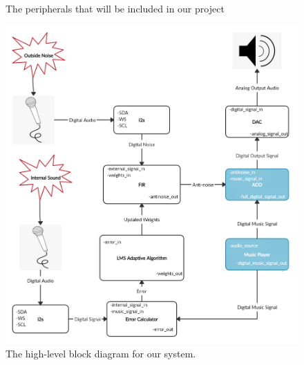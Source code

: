 \documentclass[12pt]{fpgairpods}
\begin{document}
\begin{figure}
\def\svgwidth{\linewidth}

\caption{The peripherals that will be included in our project}
\label{fig:peripherals}
\end{figure}

\begin{figure}
\includegraphics[width=\textwidth]{Proposal Block Diagram.png}
\caption{The high-level block diagram for our system.}
\label{fig:blockdiagram}
\end{figure}


\newpage
\end{document}
